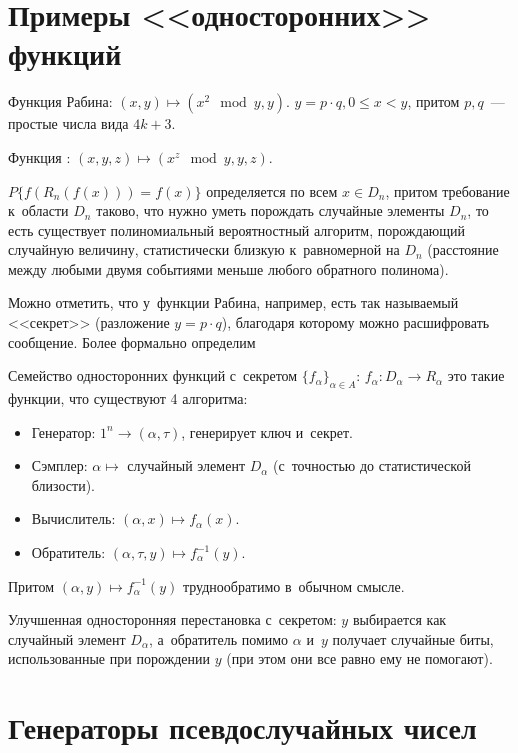\documentclass{article}
\begin{document}
\section{Примеры <<односторонних>> функций}

Функция Рабина: $(x, y) \mapsto (x^2 \mod y, y)$. $y = p \cdot q, 0 \le x < y$,
притом $p, q$~--- простые числа вида $4k + 3$.

Функция : $(x, y, z) \mapsto (x^z \mod y, y, z)$.

$P\{ f(R_n(f(x))) = f(x) \}$ определяется по всем $x \in D_n$, притом требование
к~области $D_n$ таково, что нужно уметь порождать случайные элементы $D_n$, то
есть существует полиномиальный вероятностный алгоритм, порождающий случайную
величину, статистически близкую к~равномерной на $D_n$ (расстояние между любыми
двумя событиями меньше любого обратного полинома).

Можно отметить, что у~функции Рабина, например, есть так называемый <<секрет>>
(разложение $y = p \cdot q$), благодаря которому можно расшифровать сообщение.
Более формально определим

\begin{definition}
	Семейство односторонних функций с~секретом $\{ f_\alpha \}_{\alpha \in A}$:
	$f_\alpha: D_\alpha \rightarrow R_\alpha$ это такие функции, что существуют 4
	алгоритма:
	\begin{itemize}
		\item Генератор: $1^n \rightarrow (\alpha, \tau)$, генерирует ключ и~секрет.
		\item Сэмплер: $\alpha \mapsto $ случайный элемент $D_\alpha$ (с~точностью
			до статистической близости).
		\item Вычислитель: $(\alpha, x) \mapsto f_\alpha(x)$.
		\item Обратитель: $(\alpha, \tau, y) \mapsto f_\alpha^{-1}(y)$.
	\end{itemize}
	Притом $(\alpha, y) \mapsto f_\alpha^{-1}(y)$ труднообратимо в~обычном смысле.
\end{definition}

Улучшенная односторонняя перестановка с~секретом: $y$ выбирается как случайный
элемент $D_\alpha$, а~обратитель помимо $\alpha$ и~$y$ получает случайные биты,
использованные при порождении $y$ (при этом они все равно ему не помогают).

\section{Генераторы псевдослучайных чисел}
\end{document}
